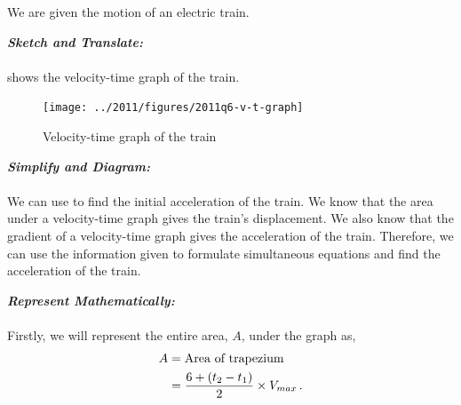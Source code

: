 %
%
%


\begin{subquestions}
	
\subquestion
We are given the motion of an electric train.

\begin{subsubquestions}
	
\subsubquestion

\textbf{\textit{Sketch and Translate:}} \\ \\
 shows the velocity-time graph of the train.
\begin{figure}[H]
	\begin{center}
		\texttt{[image: ../2011/figures/2011q6-v-t-graph]}
		\caption{\label{2011:q6:VTGraph} Velocity-time graph of the train}
	\end{center}
\end{figure}


\subsubquestion

\textbf{\textit{Simplify and Diagram:}} \\ \\ 
We can use  to find the initial acceleration of the train. We know that the area under a velocity-time graph gives the train's displacement. We also know that the gradient of a velocity-time graph gives the acceleration of the train. Therefore, we can use the information given to formulate simultaneous equations and find the acceleration of  the train.




\textbf{\textit{Represent Mathematically:}} \\ \\
Firstly, we will represent the entire area, $A$, under the graph as,
\begin{align}
	A & = \text{Area of trapezium} \nonumber \\
	  & = \frac{6 + (t_2-t_1)}{2}\times V_{max} \,. \label{2011:q6:AEqn1}
\end{align}   
	

\end{subsubquestions}
\end{subquestions}
